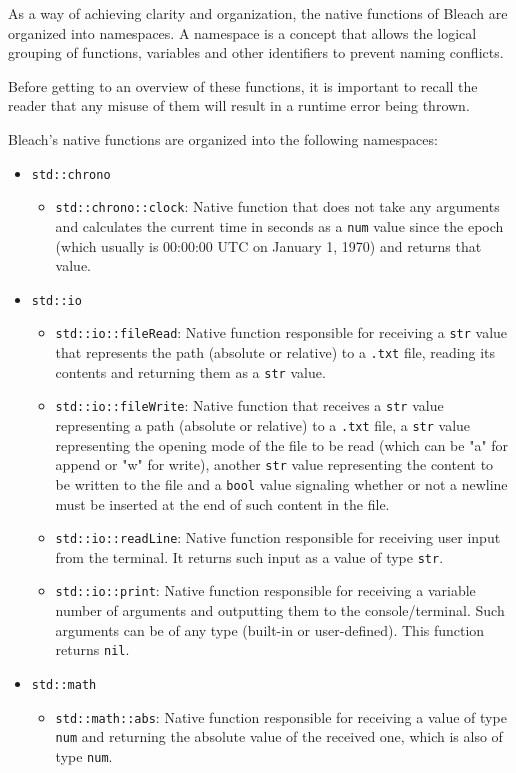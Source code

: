As a way of achieving clarity and organization, the native functions of Bleach are organized into namespaces. A namespace is a concept that allows the logical grouping of functions, variables and other identifiers to prevent naming conflicts.

Before getting to an overview of these functions, it is important to recall the reader that any misuse of them will result in a runtime error being thrown.

Bleach's native functions are organized into the following namespaces:

\begin{itemize}
    \item \texttt{std::chrono}
        \begin{itemize}
            \item \texttt{std::chrono::clock}: Native function that does not take any arguments and calculates the current time in seconds as a \texttt{num} value since the epoch (which usually is 00:00:00 UTC on January 1, 1970) and returns that value.
        \end{itemize}
    \item \texttt{std::io}
        \begin{itemize}
            \item \texttt{std::io::fileRead}: Native function responsible for receiving a \texttt{str} value that represents the path (absolute or relative) to a \texttt{.txt} file, reading its contents and returning them as a \texttt{str} value.
            
            \item \texttt{std::io::fileWrite}: Native function that receives a \texttt{str} value representing a path (absolute or relative) to a \texttt{.txt} file, a \texttt{str} value representing the opening mode of the file to be read (which can be "a" for append or "w" for write), another \texttt{str} value representing the content to be written to the file and a \texttt{bool} value signaling whether or not a newline must be inserted at the end of such content in the file.
            
            \item \texttt{std::io::readLine}: Native function responsible for receiving user input from the terminal. It returns such input as a value of type \texttt{str}.
            
            \item \texttt{std::io::print}: Native function responsible for receiving a variable number of arguments and outputting them to the console/terminal. Such arguments can be of any type (built-in or user-defined). This function returns \texttt{nil}.
        \end{itemize}
    \item \texttt{std::math}
        \begin{itemize}
            \item \texttt{std::math::abs}: Native function responsible for receiving a value of type \texttt{num} and returning the absolute value of the received one, which is also of type \texttt{num}.


\end{itemize}
\end{itemize}
